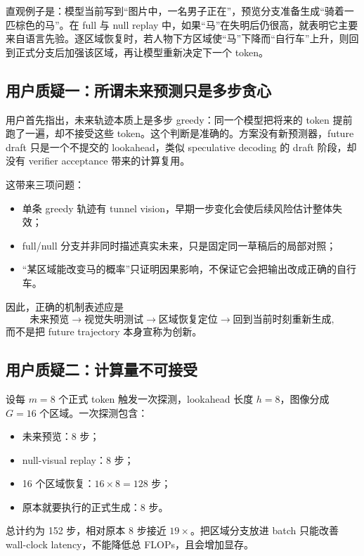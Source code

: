 \documentclass[UTF8,zihao=-4,a4paper]{ctexart}
\begin{document}
直观例子是：模型当前写到“图片中，一名男子正在”，预览分支准备生成“骑着一匹棕色的马”。在 full 与 null replay 中，如果“马”在失明后仍很高，就表明它主要来自语言先验。逐区域恢复时，若人物下方区域使“马”下降而“自行车”上升，则回到正式分支后加强该区域，再让模型重新决定下一个 token。

\subsection{用户质疑一：所谓未来预测只是多步贪心}

用户首先指出，未来轨迹本质上是多步 greedy：同一个模型把将来的 token 提前跑了一遍，却不接受这些 token。这个判断是准确的。方案没有新预测器，future draft 只是一个不提交的 lookahead，类似 speculative decoding 的 draft 阶段，却没有 verifier acceptance 带来的计算复用。

这带来三项问题：

\begin{itemize}
  \item 单条 greedy 轨迹有 tunnel vision，早期一步变化会使后续风险估计整体失效；
  \item full/null 分支并非同时描述真实未来，只是固定同一草稿后的局部对照；
  \item “某区域能改变马的概率”只证明因果影响，不保证它会把输出改成正确的自行车。
\end{itemize}

因此，正确的机制表述应是
\[
\text{未来预览}
\rightarrow
\text{视觉失明测试}
\rightarrow
\text{区域恢复定位}
\rightarrow
\text{回到当前时刻重新生成},
\]
而不是把 future trajectory 本身宣称为创新。

\subsection{用户质疑二：计算量不可接受}

设每 $m=8$ 个正式 token 触发一次探测，lookahead 长度 $h=8$，图像分成 $G=16$ 个区域。一次探测包含：

\begin{itemize}
  \item 未来预览：8 步；
  \item null-visual replay：8 步；
  \item 16 个区域恢复：$16\times 8=128$ 步；
  \item 原本就要执行的正式生成：8 步。
\end{itemize}

总计约为 152 步，相对原本 8 步接近 $19\times$。把区域分支放进 batch 只能改善 wall-clock latency，不能降低总 FLOPs，且会增加显存。
\end{document}
